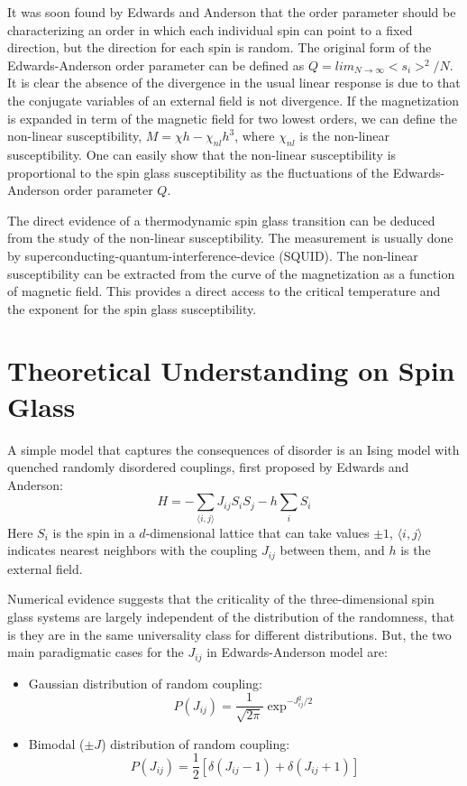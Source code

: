 It was soon found by Edwards and Anderson that the order parameter should be characterizing an order in which each individual spin can point to a fixed direction, but the direction for each spin is random. The original form of the Edwards-Anderson 
order parameter can be defined as $Q=lim_{N \rightarrow \infty} <s_{i}>^{2} / N$. It is clear the absence 
of the divergence in the usual linear response is due to that the conjugate variables of an external field is not
divergence. If the magnetization is expanded in term of the magnetic field for two lowest orders, we can define
the non-linear susceptibility, $M=\chi h - \chi_{nl} h^{3}$, where $\chi_{nl}$ is the non-linear susceptibility. 
One can easily show that the non-linear susceptibility is proportional to the spin glass susceptibility as 
the fluctuations of the Edwards-Anderson order parameter $Q$. 

The direct evidence of a thermodynamic spin glass transition can be deduced from the study of the non-linear
susceptibility. The measurement is usually done by superconducting-quantum-interference-device (SQUID). The 
non-linear susceptibility can be extracted from the curve of the magnetization as a function of magnetic field.
This provides a direct access to the critical temperature and the exponent for the spin glass susceptibility. 

\section{Theoretical Understanding on Spin Glass}
A simple model that captures the consequences of disorder is an Ising model 
with quenched randomly disordered couplings, first proposed by Edwards and 
Anderson\cite{Edwards-Anderson1975}:
\begin{equation}
  \label{eq:Edwards-Anderson}
  H=-\sum_{\langle i,j \rangle}J_{ij}S_iS_j-h\sum_iS_i
\end{equation}
Here $S_i$ is the spin in a $d$-dimensional lattice that can take values $\pm 1$,
$\langle i,j \rangle$ indicates nearest neighbors with the coupling $J_{ij}$ between 
them, and $h$ is the external field.
 
Numerical evidence suggests that the criticality of the three-dimensional
spin glass systems are largely independent of the distribution of the randomness,
that is they are in the same universality class for different distributions. 
But, the two main paradigmatic cases for the $J_{ij}$ in Edwards-Anderson model are:
\begin{itemize}
\item Gaussian distribution of random coupling:
  \begin{equation}
    \label{eq:Jij_Gaussian}
    P(J_{ij})=\frac{1}{\sqrt{2\pi}}\exp^{-J_{ij}^2/2}
  \end{equation}
\item Bimodal ($\pm J$) distribution of random coupling:
  \begin{equation}
    \label{eq:Jij_bimodal}
    P(J_{ij})=\frac{1}{2}[\delta(J_{ij}-1)+\delta(J_{ij}+1)]
  \end{equation}
\end{itemize}

